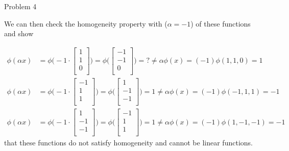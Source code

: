 \begin{problem}{Problem 4}
\begin{highlight}[Solution]
        We can then check the homogeneity property with ($\alpha = -1$) of these functions and show

        \begin{align}
            \phi(\alpha x) & = \phi \Bigg(
                -1 \cdot 
                \begin{bmatrix}
                    1 \\
                    1 \\
                    0 \\
                \end{bmatrix}
                \Bigg) = \phi \Bigg(
                \begin{bmatrix}
                    -1 \\
                    -1 \\
                    0 \\
                \end{bmatrix}
                \Bigg) = ? \neq \alpha \phi(x) = (-1) \phi(1,1,0) = 1 \\
            \phi(\alpha x) & = \phi \Bigg(
                -1 \cdot 
                \begin{bmatrix}
                    -1 \\
                    1 \\
                    1 \\
                \end{bmatrix}
                \Bigg) = \phi \Bigg(
                \begin{bmatrix}
                    1 \\
                    -1 \\
                    -1 \\
                \end{bmatrix}
                \Bigg) = 1 \neq \alpha \phi(x) = (-1) \phi(-1,1,1) = -1  \\
            \phi(\alpha x) & = \phi \Bigg(
                -1 \cdot 
                \begin{bmatrix}
                    1 \\
                    -1 \\
                    -1 \\
                \end{bmatrix}
                \Bigg) = \phi \Bigg(
                \begin{bmatrix}
                    -1 \\
                    1 \\
                    1 \\
                \end{bmatrix}
                \Bigg) = 1 \neq \alpha \phi(x) = (-1)\phi(1,-1,-1) = -1
        \end{align}
        that these functions do not satisfy homogeneity and cannot be linear functions.
    \end{highlight}
\end{problem}

